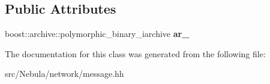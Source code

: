 \subsection*{\-Public \-Attributes}
\begin{DoxyCompactItemize}
\item 
\hypertarget{classgal_1_1network_1_1imessage_aaa6a96d54ae0ca55b149698db0d68c78}{boost\-::archive\-::polymorphic\-\_\-binary\-\_\-iarchive {\bfseries ar\-\_\-}}\label{classgal_1_1network_1_1imessage_aaa6a96d54ae0ca55b149698db0d68c78}

\end{DoxyCompactItemize}


\-The documentation for this class was generated from the following file\-:\begin{DoxyCompactItemize}
\item 
src/\-Nebula/network/message.\-hh\end{DoxyCompactItemize}
